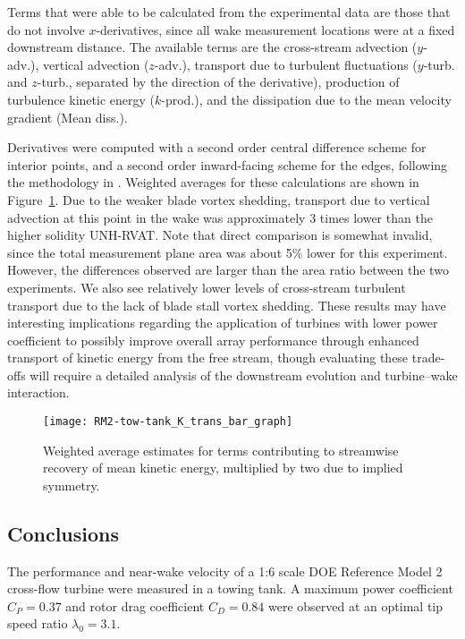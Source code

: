 Terms that were able to be calculated from the experimental data are those that
do not involve $x$-derivatives, since all wake measurement locations were at a
fixed downstream distance. The available terms are the cross-stream advection
($y$-adv.), vertical advection ($z$-adv.), transport due to turbulent
fluctuations ($y$-turb. and $z$-turb., separated by the direction of the
derivative), production of turbulence kinetic energy ($k$-prod.), and the
dissipation due to the mean velocity gradient (Mean diss.).

Derivatives were computed with a second order central difference scheme for
interior points, and a second order inward-facing scheme for the edges,
following the methodology in \cite{Bachant2015-JoT}. Weighted averages for these
calculations are shown in Figure~\ref{fig:Ktransport}. Due to the weaker blade
vortex shedding, transport due to vertical advection at this point in the wake
was approximately 3 times lower than the higher solidity UNH-RVAT. Note that
direct comparison is somewhat invalid, since the total measurement plane area
was about 5\% lower for this experiment. However, the differences observed are
larger than the area ratio between the two experiments. We also see relatively
lower levels of cross-stream turbulent transport due to the lack of blade stall
vortex shedding. These results may have interesting implications regarding the
application of turbines with lower power coefficient to possibly improve overall
array performance through enhanced transport of kinetic energy from the free
stream, though evaluating these trade-offs will require a detailed analysis of
the downstream evolution and turbine--wake interaction.

\begin{figure}
    \texttt{[image: RM2-tow-tank\_K\_trans\_bar\_graph]}
    
    \caption{Weighted average estimates for terms contributing to streamwise
        recovery of mean kinetic energy, multiplied by two due to implied symmetry.}
    
    \label{fig:Ktransport}
\end{figure}


\subsection{Conclusions}

The performance and near-wake velocity of a 1:6 scale DOE Reference Model 2
cross-flow turbine were measured in a towing tank. A maximum power coefficient
$C_P = 0.37$ and rotor drag coefficient $C_D = 0.84$ were observed at an optimal
tip speed ratio $\lambda_0 = 3.1$.

